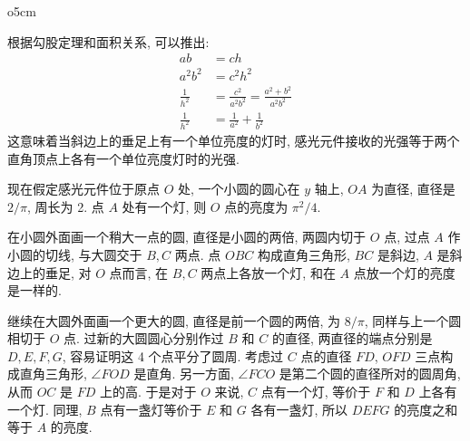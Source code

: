 \begin{wrapfigure}{o}{5cm}
\centering
{}
\end{wrapfigure}
\indent 根据勾股定理和面积关系, 可以推出:
\begin{align*}
ab &= ch \\
a^2b^2 &= c^2h^2\\
\frac{1}{h^2} &= \frac{c^2}{a^2b^2}=\frac{a^2+b^2}{a^2b^2}\\
\frac{1}{h^2} &= \frac{1}{a^2} + \frac{1}{b^2}
\end{align*}
这意味着当斜边上的垂足上有一个单位亮度的灯时, 感光元件接收的光强等于两个直角顶点上各有一个单位亮度灯时的光强.

现在假定感光元件位于原点 $ O $ 处, 一个小圆的圆心在 $ y $ 轴上, $ OA $ 为直径, 直径是 $ 2/\pi $, 周长为 2. 点 $ A $ 处有一个灯, 则 $ O $ 点的亮度为 $ \pi^2/4 $. 

在小圆外面画一个稍大一点的圆, 直径是小圆的两倍, 两圆内切于 $ O $ 点, 过点 $ A $ 作小圆的切线, 与大圆交于 $ B, C $ 两点. 点 $ OBC $ 构成直角三角形, $ BC $ 是斜边, $ A $ 是斜边上的垂足, 对 $ O $ 点而言, 在 $ B, C $ 两点上各放一个灯, 和在 $ A $ 点放一个灯的亮度是一样的. 

继续在大圆外面画一个更大的圆, 直径是前一个圆的两倍, 为 $ 8/\pi $, 同样与上一个圆相切于 $ O $ 点. 过新的大圆圆心分别作过 $ B $ 和 $ C $ 的直径, 两直径的端点分别是 $ D, E, F, G $, 容易证明这 4 个点平分了圆周. 考虑过 $ C $ 点的直径 $ FD $, $ OFD $ 三点构成直角三角形, $ \angle FOD $ 是直角. 另一方面, $ \angle FCO $ 是第二个圆的直径所对的圆周角, 从而 $ OC $ 是 $ FD $ 上的高. 于是对于 $ O $ 来说, $ C $ 点有一个灯, 等价于 $ F $ 和 $ D $ 上各有一个灯. 同理, $ B $ 点有一盏灯等价于 $ E $ 和 $ G $ 各有一盏灯, 所以 $ DEFG $ 的亮度之和等于 $ A $ 的亮度.

